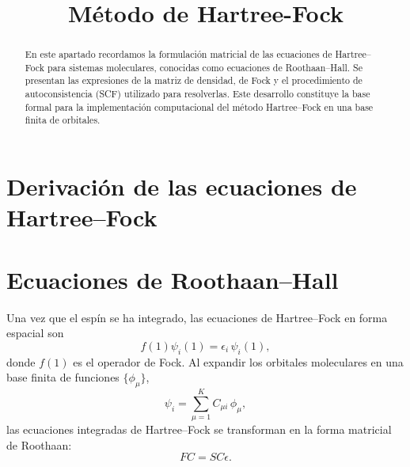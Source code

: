 \documentclass[11pt]{article}
\date{}
\title{Método de Hartree-Fock}
\begin{document}
\maketitle

\begin{abstract}
En este apartado recordamos la formulación matricial de las ecuaciones de Hartree–Fock para sistemas moleculares, conocidas como ecuaciones de Roothaan–Hall. Se presentan las expresiones de la matriz de densidad, de Fock y el procedimiento de autoconsistencia (SCF) utilizado para resolverlas. Este desarrollo constituye la base formal para la implementación computacional del método Hartree–Fock en una base finita de orbitales.
\end{abstract}

\section{Derivación de las ecuaciones de Hartree–Fock}
\label{sec:hf-derivation}

\vspace{6cm}

\section{Ecuaciones de Roothaan–Hall}
\label{sec:roothaan}

Una vez que el espín se ha integrado, las ecuaciones de Hartree–Fock en forma espacial son
\[
f(1)\psi_i(1) = \epsilon_i\,\psi_i(1),
\]
donde \( f(1) \) es el operador de Fock.  
Al expandir los orbitales moleculares en una base finita de funciones \( \{\phi_\mu\} \),
\[
\psi_i = \sum_{\mu=1}^K C_{\mu i}\,\phi_\mu,
\]
las ecuaciones integradas de Hartree–Fock se transforman en la forma matricial de Roothaan:
\begin{equation}
\label{eq:roothaan}
\boxed{FC = SC\epsilon.}
\end{equation}
\end{document}
